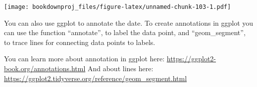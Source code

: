 \documentclass[
]{article}
\newenvironment{Shaded}{\begin{snugshade}}{\end{snugshade}}
\newcommand{\DataTypeTok}[1]{\textcolor[rgb]{0.13,0.29,0.53}{#1}}
\newcommand{\DecValTok}[1]{\textcolor[rgb]{0.00,0.00,0.81}{#1}}
\newcommand{\FloatTok}[1]{\textcolor[rgb]{0.00,0.00,0.81}{#1}}
\newcommand{\KeywordTok}[1]{\textcolor[rgb]{0.13,0.29,0.53}{\textbf{#1}}}
\newcommand{\NormalTok}[1]{#1}
\newcommand{\OperatorTok}[1]{\textcolor[rgb]{0.81,0.36,0.00}{\textbf{#1}}}
\newcommand{\StringTok}[1]{\textcolor[rgb]{0.31,0.60,0.02}{#1}}
\begin{document}
\begin{Shaded}
\end{Shaded}

\texttt{[image: bookdownproj\_files/figure-latex/unnamed-chunk-103-1.pdf]}

You can also use ggplot to annotate the date. To create annotations in ggplot you can use the function ``annotate'', to label the data point, and ``geom\_segment'', to trace lines for connecting data points to labels.

You can learn more about annotation in ggplot here: \url{https://ggplot2-book.org/annotations.html}
And about lines here: \url{https://ggplot2.tidyverse.org/reference/geom_segment.html}
\end{document}

